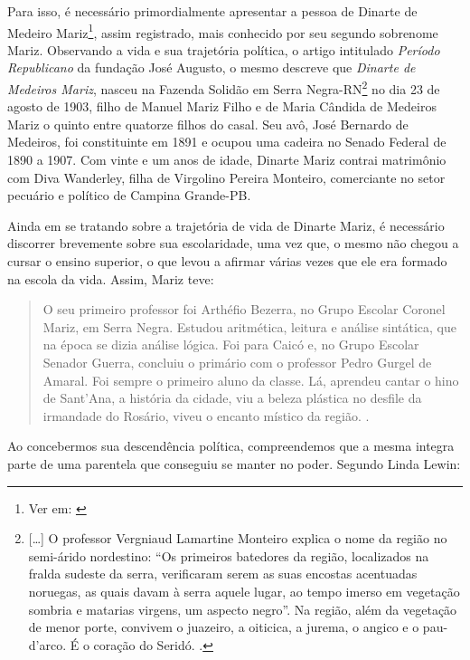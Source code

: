 \begin{refsection}
    Para isso, é necessário primordialmente apresentar a pessoa de Dinarte de Medeiro Mariz\footnote{Ver em: \textcite[p.~220]{Maia2005Dinarte}}, assim registrado, mais conhecido por seu segundo sobrenome Mariz. Observando a vida e sua trajetória política, o artigo intitulado \textit{Período Republicano} da fundação José Augusto, o mesmo descreve que \textit{Dinarte de Medeiros Mariz}, nasceu na Fazenda Solidão em Serra Negra-RN\footnote{[\dots] O professor Vergniaud Lamartine Monteiro explica o nome da região no semi-árido nordestino: ``Os primeiros batedores da região, localizados na fralda sudeste da serra, verificaram serem as suas encostas acentuadas noruegas, as quais davam à serra aquele lugar, ao tempo imerso em vegetação sombria e matarias virgens, um aspecto negro''. Na região, além da vegetação de menor porte, convivem o juazeiro, a oiticica, a jurema, o angico e o pau-d'arco. É o coração do Seridó. \cite[p.~39--40]{Lima2003Solidao}.} no dia 23 de agosto de 1903, filho de Manuel Mariz Filho e de Maria Cândida de Medeiros Mariz o quinto entre quatorze filhos do casal. Seu avô, José Bernardo de Medeiros, foi constituinte em 1891 e ocupou uma cadeira no Senado Federal de 1890 a 1907. Com vinte e um anos de idade, Dinarte Mariz contrai matrimônio com Diva Wanderley, filha de Virgolino Pereira Monteiro, comerciante no setor pecuário e político de Campina Grande-PB.

    Ainda em se tratando sobre a trajetória de vida de Dinarte Mariz, é necessário discorrer brevemente sobre sua escolaridade, uma vez que, o mesmo não chegou a cursar o ensino superior, o que levou a afirmar várias vezes que ele era formado na escola da vida. Assim, Mariz teve:

    \begin{quotation}
        O seu primeiro professor foi Arthéfio Bezerra, no Grupo Escolar Coronel Mariz, em Serra Negra. Estudou aritmética, leitura e análise sintática, que na época se dizia análise lógica. Foi para Caicó e, no Grupo Escolar Senador Guerra, concluiu o primário com o professor Pedro Gurgel de Amaral. Foi sempre o primeiro aluno da classe. Lá, aprendeu cantar o hino de Sant'Ana, a história da cidade, viu a beleza plástica no desfile da irmandade do Rosário, viveu o encanto místico da região. \cite[p.~41]{Lima2013Sertao}.
    \end{quotation}

    Ao concebermos sua descendência política, compreendemos que a mesma integra parte de uma parentela que conseguiu se manter no poder. Segundo Linda Lewin:


\end{refsection}
